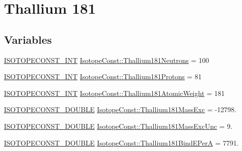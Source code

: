 \hypertarget{group___isotope_const-_thallium-_tl181}{}\section{Thallium 181}
\label{group___isotope_const-_thallium-_tl181}
\subsection*{Variables}
\begin{DoxyCompactItemize}
\item 
\mbox{\hyperlink{group___isotope_const-_macros_ga5f18360b3e99483a35c32d789e62621c}{I\+S\+O\+T\+O\+P\+E\+C\+O\+N\+S\+T\+\_\+\+I\+NT}} \mbox{\hyperlink{group___isotope_const-_thallium-_tl181_ga906545fab2b0a23a4a56b2df7e88f912}{Isotope\+Const\+::\+Thallium181\+Neutrons}} = 100
\item 
\mbox{\hyperlink{group___isotope_const-_macros_ga5f18360b3e99483a35c32d789e62621c}{I\+S\+O\+T\+O\+P\+E\+C\+O\+N\+S\+T\+\_\+\+I\+NT}} \mbox{\hyperlink{group___isotope_const-_thallium-_tl181_ga7ef735318fa518055c70209bc955fa98}{Isotope\+Const\+::\+Thallium181\+Protons}} = 81
\item 
\mbox{\hyperlink{group___isotope_const-_macros_ga5f18360b3e99483a35c32d789e62621c}{I\+S\+O\+T\+O\+P\+E\+C\+O\+N\+S\+T\+\_\+\+I\+NT}} \mbox{\hyperlink{group___isotope_const-_thallium-_tl181_ga4d3cf2026dbfbc459ffd2e1157a9be0a}{Isotope\+Const\+::\+Thallium181\+Atomic\+Weight}} = 181
\item 
\mbox{\hyperlink{group___isotope_const-_macros_ga8f45a7272ce02c0b4c65c44636ed719a}{I\+S\+O\+T\+O\+P\+E\+C\+O\+N\+S\+T\+\_\+\+D\+O\+U\+B\+LE}} \mbox{\hyperlink{group___isotope_const-_thallium-_tl181_gacf510de5ccfa783df7c5cde2581b1c9b}{Isotope\+Const\+::\+Thallium181\+Mass\+Exc}} = -\/12798.
\item 
\mbox{\hyperlink{group___isotope_const-_macros_ga8f45a7272ce02c0b4c65c44636ed719a}{I\+S\+O\+T\+O\+P\+E\+C\+O\+N\+S\+T\+\_\+\+D\+O\+U\+B\+LE}} \mbox{\hyperlink{group___isotope_const-_thallium-_tl181_gac35b84f4b6ce60db2254bec0284e4c09}{Isotope\+Const\+::\+Thallium181\+Mass\+Exc\+Unc}} = 9.
\item 
\mbox{\hyperlink{group___isotope_const-_macros_ga8f45a7272ce02c0b4c65c44636ed719a}{I\+S\+O\+T\+O\+P\+E\+C\+O\+N\+S\+T\+\_\+\+D\+O\+U\+B\+LE}} \mbox{\hyperlink{group___isotope_const-_thallium-_tl181_gaf910bda333e8eb9332217a01af898fbf}{Isotope\+Const\+::\+Thallium181\+Bind\+E\+PerA}} = 7791.
\item 

\end{DoxyCompactItemize}
